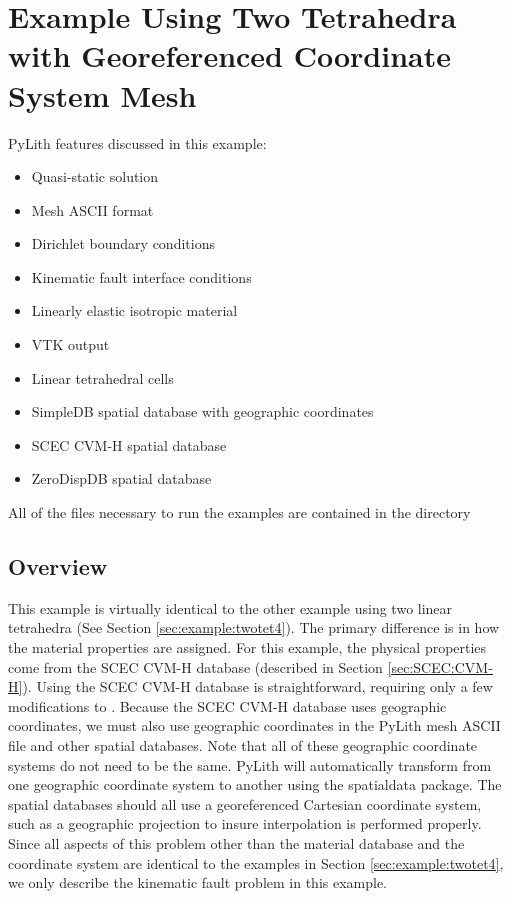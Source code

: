 
\section{Example Using Two Tetrahedra with Georeferenced Coordinate System Mesh}
\label{sec:examples:twotet4-geoproj}

PyLith features discussed in this example:
\begin{itemize}
\item Quasi-static solution
\item Mesh ASCII format
\item Dirichlet boundary conditions
\item Kinematic fault interface conditions
\item Linearly elastic isotropic material
\item VTK output
\item Linear tetrahedral cells
\item SimpleDB spatial database with geographic coordinates
\item SCEC CVM-H spatial database
\item ZeroDispDB spatial database
\end{itemize}
All of the files necessary to run the examples are contained in the
directory 


\subsection{Overview}

This example is virtually identical to the other example using two
linear tetrahedra (See Section \vref{sec:example:twotet4}). The
primary difference is in how the material properties are assigned.
For this example, the physical properties come from the SCEC CVM-H
database (described in Section \vref{sec:SCEC:CVM-H}). Using the SCEC
CVM-H database is straightforward, requiring only a few modifications
to . Because the SCEC CVM-H database uses
geographic coordinates, we must also use geographic coordinates in the
PyLith mesh ASCII file and other spatial databases. Note that all of
these geographic coordinate systems do not need to be the same. PyLith
will automatically transform from one geographic coordinate system to
another using the spatialdata package. The spatial databases should
all use a georeferenced Cartesian coordinate system, such as a
geographic projection to insure interpolation is performed
properly. Since all aspects of this problem other than the material
database and the coordinate system are identical to the examples in
Section \vref{sec:example:twotet4}, we only describe the kinematic
fault problem in this example.


